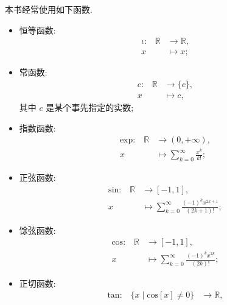 \begin{definition}
    本书经常使用如下函数.
    \begin{itemize}
        \item 恒等函数:
              \begin{align*}
                  \text{$\iota$:} \quad
                  \mathbb{R} & \to \mathbb{R}, \\
                  x          & \mapsto x;
              \end{align*}
        \item 常函数:
              \begin{align*}
                  \text{$c$:} \quad
                  \mathbb{R} & \to \{ c \}, \\
                  x          & \mapsto c,
              \end{align*}
              其中 $c$ 是某个事先指定的实数;
        \item 指数函数:
              \begin{align*}
                  \text{$\mathrm{exp}$:} \quad
                  \mathbb{R} & \to (0, +\infty),                               \\
                  x          & \mapsto \sum_{k = 0}^{\infty} {\frac{x^k}{k!}};
              \end{align*}
        \item 正弦函数:
              \begin{align*}
                  \text{$\mathrm{sin}$:} \quad
                  \mathbb{R} & \to [-1, 1],                                                     \\
                  x          & \mapsto \sum_{k = 0}^{\infty} {\frac{(-1)^k x^{2k+1}}{(2k+1)!}};
              \end{align*}
        \item 馀弦函数:
              \begin{align*}
                  \text{$\mathrm{cos}$:} \quad
                  \mathbb{R} & \to [-1, 1],                                                 \\
                  x          & \mapsto \sum_{k = 0}^{\infty} {\frac{(-1)^k x^{2k}}{(2k)!}};
              \end{align*}
        \item 正切函数:
              \begin{align*}
                  \text{$\mathrm{tan}$:} \quad
                  \{ x \mid \mathrm{cos} {[x]} \neq 0 \} & \to \mathbb{R},                                         \\

\end{align*}
\end{itemize}
\end{definition}
